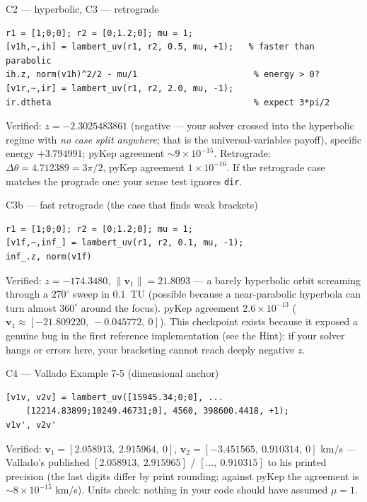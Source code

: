 \documentclass[11pt,letterpaper]{article}
\newcommand{\dth}{\Delta\theta}
\begin{document}
\begin{checkpoint}{C2 --- hyperbolic, C3 --- retrograde}
\begin{verbatim}
r1 = [1;0;0]; r2 = [0;1.2;0]; mu = 1;
[v1h,~,ih] = lambert_uv(r1, r2, 0.5, mu, +1);   % faster than parabolic
ih.z, norm(v1h)^2/2 - mu/1                       % energy > 0?
[v1r,~,ir] = lambert_uv(r1, r2, 2.0, mu, -1);
ir.dtheta                                        % expect 3*pi/2
\end{verbatim}
Verified: $z = -2.3025483861$ (negative --- your solver crossed into the
hyperbolic regime with \emph{no case split anywhere}; that is the
universal-variables payoff), specific energy $+3.794991$; pyKep agreement
$\sim$$9\times10^{-15}$. Retrograde: $\dth = 4.712389 = 3\pi/2$, pyKep
agreement $1\times10^{-16}$. If the retrograde case matches the prograde
one: your sense test ignores \texttt{dir}.
\end{checkpoint}

\begin{checkpoint}{C3b --- fast retrograde (the case that finds weak brackets)}
\begin{verbatim}
r1 = [1;0;0]; r2 = [0;1.2;0]; mu = 1;
[v1f,~,inf_] = lambert_uv(r1, r2, 0.1, mu, -1);
inf_.z, norm(v1f)
\end{verbatim}
Verified: $z = -174.3480$, $\|\mathbf v_1\| = 21.8093$ --- a barely
hyperbolic orbit screaming through a $270^\circ$ sweep in $0.1$~TU
(possible because a near-parabolic hyperbola can turn almost $360^\circ$
around the focus). pyKep agreement $2.6\times10^{-13}$
($\mathbf v_1 \approx [-21.809220,\ -0.045772,\ 0]$). This checkpoint
exists because it exposed a genuine bug in the first reference
implementation (see the Hint): if your solver hangs or errors here, your
bracketing cannot reach deeply negative $z$.
\end{checkpoint}

\begin{checkpoint}{C4 --- Vallado Example 7-5 (dimensional anchor)}
\begin{verbatim}
[v1v, v2v] = lambert_uv([15945.34;0;0], ...
    [12214.83899;10249.46731;0], 4560, 398600.4418, +1);
v1v', v2v'
\end{verbatim}
Verified: $\mathbf v_1 = [2.058913,\ 2.915964,\ 0]$,
$\mathbf v_2 = [-3.451565,\ 0.910314,\ 0]$ km/s --- Vallado's published
$[2.058913,\ 2.915965]$ / $[\dots,\ 0.910315]$ to his printed precision
(the last digits differ by print rounding; against pyKep the agreement is
$\sim$$8\times10^{-15}$ km/s). Units check: nothing in your code should
have assumed $\mu = 1$.
\end{checkpoint}
\end{document}
